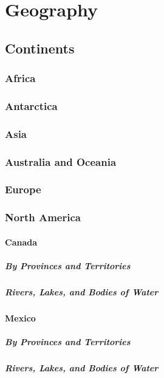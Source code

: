 \chapter{Geography}
	\section{Continents}
	\subsection{Africa}
	\subsection{Antarctica}
	\subsection{Asia}
	\subsection{Australia and Oceania}
	\subsection{Europe}
	\subsection{North America}
		\subsubsection{Canada}
			\paragraph{By Provinces and Territories}
			\paragraph{Rivers, Lakes, and Bodies of Water}
			
		\subsubsection{Mexico}
						\paragraph{By Provinces and Territories}
			\paragraph{Rivers, Lakes, and Bodies of Water}
		
